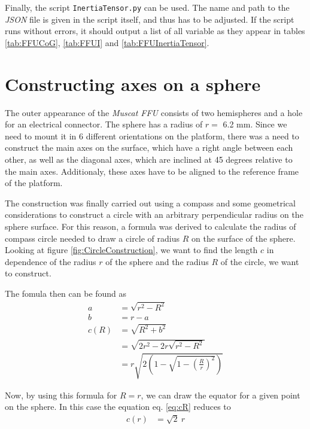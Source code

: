 \documentclass[journal]{IEEEtran}
\begin{document}
Finally, the script \texttt{InertiaTensor.py} can be used. The name and path to the \emph{JSON} file is given in the script itself, and thus has to be adjusted.
If the script runs without errors, it should output a list of all variable as they appear in tables \ref{tab:FFUCoG}, \ref{tab:FFUI} and \ref{tab:FFUInertiaTensor}.


\clearpage
\section{Constructing axes on a sphere}
\label{seq:ConstructAxes}

The outer appearance of the \emph{Muscat FFU} consists of two hemispheres and a hole for an electrical connector. The sphere has a radius of $r =$ 6.2 mm.
Since we need to mount it in 6 different orientations on the platform, there was a need to construct the main axes on the surface, which have a right angle between each other, as well as the diagonal axes, which are inclined at 45 degrees relative to the main axes.
Additionaly, these axes have to be aligned to the reference frame of the platform.

The construction was finally carried out using a compass and some geometrical considerations to construct a circle with an arbitrary perpendicular radius on the sphere surface.
For this reason, a formula was derived to calculate the radius of compass circle needed to draw a circle of radius $R$ on the surface of the sphere.
Looking at figure \ref{fig:CircleConstruction}, we want to find the length $c$ in dependence of the radius $r$ of the sphere and the radius $R$ of the circle, we want to construct.

The fomula then can be found as
\begin{align}
	a & = \sqrt{r^2 - R^2} \\
	b & = r - a \\
	c(R) & = \sqrt{R^2 + b^2}\\
	& = \sqrt{2r^2 - 2r \sqrt{r^2 - R^2}} \\
	& = r \sqrt{2 \left(  1 - \sqrt{1 - \left( \frac{R}{r} \right)^2 } \right)}
	\label{eq:cR}
\end{align}

Now, by using this formula for $R = r$, we can draw the equator for a given point on the sphere.
In this case the equation eq. \eqref{eq:cR} reduces to
\begin{align}
	c(r) & = \sqrt{2}~r
\end{align}
\end{document}
